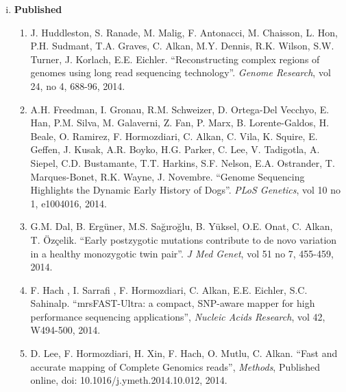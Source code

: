 % 

\begin{enumerate}[i)]
\item {\bf Published} %

\begin{enumerate}

\item J. Huddleston, S. Ranade, M. Malig, F. Antonacci, M. Chaisson, L. Hon, P.H. Sudmant, T.A. Graves, C. Alkan, M.Y. Dennis, R.K. Wilson, S.W. Turner, J. Korlach, E.E. Eichler. ``Reconstructing complex regions of genomes using long read sequencing technology''. {\em Genome Research}, vol 24, no 4, 688-96, 2014.

\item A.H. Freedman, I. Gronau, R.M. Schweizer, D. Ortega-Del Vecchyo, E. Han, P.M. Silva, M. Galaverni, Z. Fan, P. Marx, B. Lorente-Galdos, H. Beale, O. Ramirez, F. Hormozdiari, C. Alkan, C. Vila, K. Squire, E. Geffen, J. Kusak, A.R. Boyko, H.G. Parker, C. Lee, V. Tadigotla, A. Siepel, C.D. Bustamante, T.T. Harkins, S.F. Nelson, E.A. Ostrander, T. Marques-Bonet, R.K. Wayne, J. Novembre. ``Genome Sequencing Highlights the Dynamic Early History of Dogs''. {\em PLoS Genetics}, vol 10 no 1, e1004016, 2014.

\item G.M. Dal, B. Ergüner, M.S. Sağıroğlu, B. Yüksel, O.E. Onat, C. Alkan, T. Özçelik. ``Early postzygotic mutations contribute to de novo variation in a healthy monozygotic twin pair''. {\em J Med Genet}, vol 51 no 7, 455-459, 2014.

\item F. Hach , I. Sarrafi , F. Hormozdiari, C. Alkan, E.E. Eichler, S.C. Sahinalp. ``mrsFAST-Ultra: a compact, SNP-aware mapper for high performance sequencing applications'', {\em Nucleic Acids Research}, vol 42, W494-500, 2014.
  
\item D. Lee, F. Hormozdiari, H. Xin, F. Hach, O. Mutlu, C. Alkan. ``Fast and accurate mapping of Complete Genomics reads'', {\em Methods}, Published online, doi: 10.1016/j.ymeth.2014.10.012, 2014.
  

\end{enumerate}
\end{enumerate}
